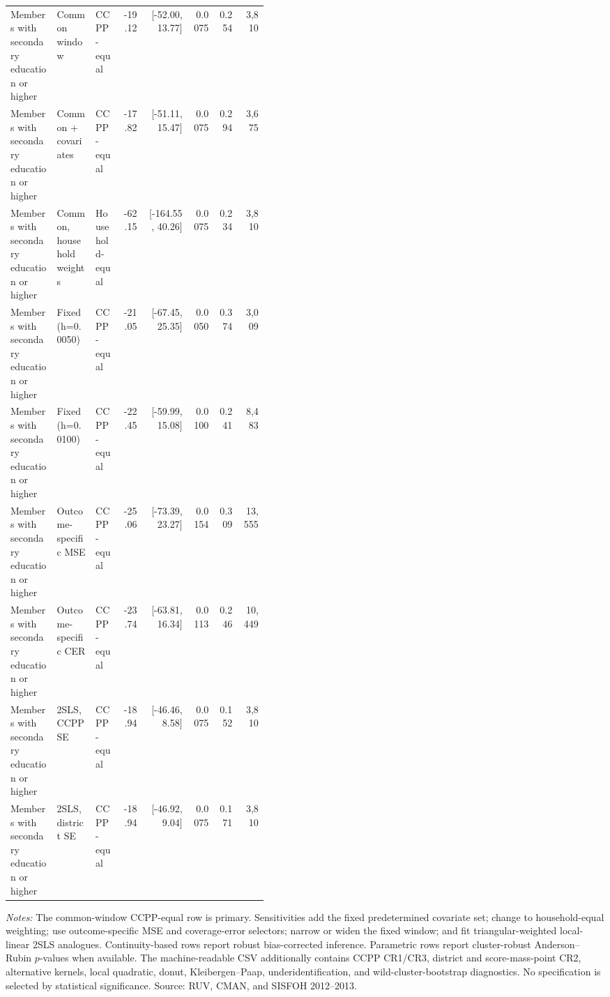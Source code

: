\begin{longtable}{p{0.18\linewidth}p{0.15\linewidth}p{0.10\linewidth}rrrrr}
Members with secondary education or higher & Common window & CCPP-equal & -19.12 & [-52.00, 13.77] & 0.0075 & 0.254 & 3,810 \\
Members with secondary education or higher & Common + covariates & CCPP-equal & -17.82 & [-51.11, 15.47] & 0.0075 & 0.294 & 3,675 \\
Members with secondary education or higher & Common, household weights & Household-equal & -62.15 & [-164.55, 40.26] & 0.0075 & 0.234 & 3,810 \\
Members with secondary education or higher & Fixed (h=0.0050) & CCPP-equal & -21.05 & [-67.45, 25.35] & 0.0050 & 0.374 & 3,009 \\
Members with secondary education or higher & Fixed (h=0.0100) & CCPP-equal & -22.45 & [-59.99, 15.08] & 0.0100 & 0.241 & 8,483 \\
Members with secondary education or higher & Outcome-specific MSE & CCPP-equal & -25.06 & [-73.39, 23.27] & 0.0154 & 0.309 & 13,555 \\
Members with secondary education or higher & Outcome-specific CER & CCPP-equal & -23.74 & [-63.81, 16.34] & 0.0113 & 0.246 & 10,449 \\
Members with secondary education or higher & 2SLS, CCPP SE & CCPP-equal & -18.94 & [-46.46, 8.58] & 0.0075 & 0.152 & 3,810 \\
Members with secondary education or higher & 2SLS, district SE & CCPP-equal & -18.94 & [-46.92, 9.04] & 0.0075 & 0.171 & 3,810 \\
\bottomrule
\end{longtable}
\begin{minipage}{0.98\linewidth}\footnotesize\textit{Notes:} The common-window CCPP-equal row is primary. Sensitivities add the fixed predetermined covariate set; change to household-equal weighting; use outcome-specific MSE and coverage-error selectors; narrow or widen the fixed window; and fit triangular-weighted local-linear 2SLS analogues. Continuity-based rows report robust bias-corrected inference. Parametric rows report cluster-robust Anderson--Rubin \(p\)-values when available. The machine-readable CSV additionally contains CCPP CR1/CR3, district and score-mass-point CR2, alternative kernels, local quadratic, donut, Kleibergen--Paap, underidentification, and wild-cluster-bootstrap diagnostics. No specification is selected by statistical significance. Source: RUV, CMAN, and SISFOH 2012--2013.\end{minipage}
\endgroup
